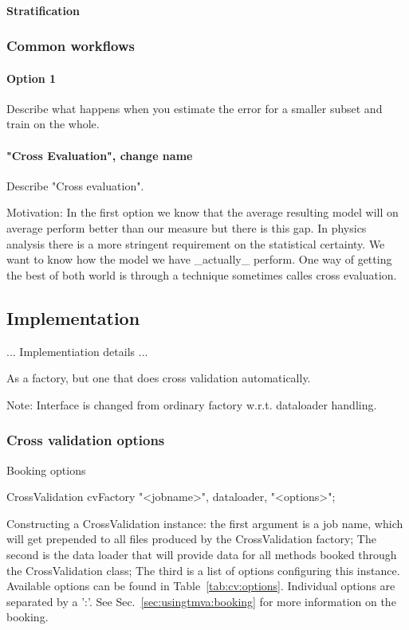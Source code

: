 \paragraph{Stratification}


\subsubsection{Common workflows}

\paragraph{Option 1}
Describe what happens when you estimate the error for a smaller subset and train on the whole.
\paragraph{"Cross Evaluation", change name}
Describe "Cross evaluation".

Motivation:
In the first option we know that the average resulting model will on average
perform better than our measure but there is this gap. In physics analysis
there is a more stringent requirement on the statistical certainty. We want to
know how the model we have _actually_ perform. One way of getting the best of
both world is through a technique sometimes calles cross evaluation.




\subsection{Implementation}

... Implementiation details ...

As a factory, but one that does cross validation automatically.

Note: Interface is changed from ordinary factory w.r.t. dataloader handling.

\subsubsection{Cross validation options}
Booking options
\begin{codeexample}
\begin{tmvacode}
CrossValidation cvFactory {"<jobname>", dataloader, "<options>"};
\end{tmvacode}
\caption[.]{\codeexampleCaptionSize Constructing a CrossValidation instance:
   the first argument is a job name, which will get prepended to all files
   produced by the CrossValidation factory; The second is the data loader that
   will provide data for all methods booked through the CrossValidation class;
   The third is a list of options configuring this instance. Available options
   can be found in Table~\ref{tab:cv:options}.
   Individual options are separated by a ':'. See
   Sec.~\ref{sec:usingtmva:booking} for more information on the booking.}
\end{codeexample}


